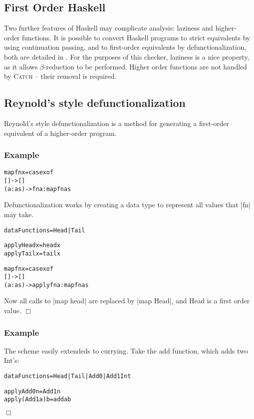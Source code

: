 \documentclass[preprint]{sigplanconf}
\newcommand{\C}[1]{\textsf{#1}}
\newcommand{\catch}{\textsc{Catch}}
\newcounter{exmp}
\newcommand{\yesexample}{\subsubsection*{Example \arabic{exmp}}\addtocounter{exmp}{1}}
\newcommand{\noexample}{\hfill$\Box$}
\newenvironment{code}{\begin{alltt}\small}{\end{alltt}}
\newenvironment{example}{\yesexample}{\noexample}
\begin{document}
\subsection{First Order Haskell}

Two further features of Haskell may complicate analysis: laziness and higher-order functions. It is possible to convert Haskell programs to strict equivalents by using continuation passing, and to first-order equivalents by defunctionalization, both are detailed in \citet{reynolds:defunc}. For the purposes of this checker, laziness is a nice property, as it allows $\beta$-reduction to be performed. Higher order functions are not handled by \catch{} -- their removal is required.

\subsection{Reynold's style defunctionalization}

Reynold's style defunctionalization \citep{reynolds:defunc} is a method for generating a first-order equivalent of a higher-order program.

\begin{example}
\begin{code}
map fn x = case  x of
                 []      -> []
                 (a:as)  -> fn a : map fn as
\end{code}

Defunctionalization works by creating a data type to represent all values that |fn| may take.

\begin{code}
data Functions = Head | Tail

apply Head  x = head  x
apply Tail  x = tail  x

map fn x = case  x of
                 []      -> []
                 (a:as)  -> apply fn a : map fn as
\end{code}

Now all calls to |map head| are replaced by |map Head|, and \C{Head} is a first order value.
\end{example}

\begin{example}
The scheme easily extendeds to currying. Take the \C{add} function, which adds two \C{Int}'s:

\begin{code}
data Functions = Head | Tail | Add0 | Add1 Int

apply Add0      n  = Add1 n
apply (Add1 a)  b  = add a b
\end{code}
\end{example}
\end{document}

